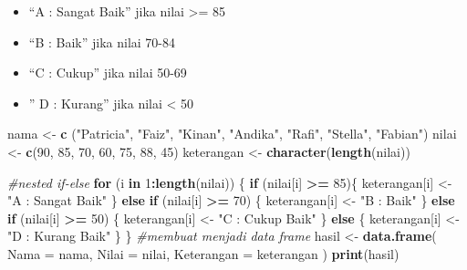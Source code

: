 \documentclass[
]{article}
\newenvironment{Shaded}{\begin{snugshade}}{\end{snugshade}}
\newcommand{\AttributeTok}[1]{\textcolor[rgb]{0.13,0.29,0.53}{#1}}
\newcommand{\CommentTok}[1]{\textcolor[rgb]{0.56,0.35,0.01}{\textit{#1}}}
\newcommand{\ControlFlowTok}[1]{\textcolor[rgb]{0.13,0.29,0.53}{\textbf{#1}}}
\newcommand{\DecValTok}[1]{\textcolor[rgb]{0.00,0.00,0.81}{#1}}
\newcommand{\FunctionTok}[1]{\textcolor[rgb]{0.13,0.29,0.53}{\textbf{#1}}}
\newcommand{\NormalTok}[1]{#1}
\newcommand{\OtherTok}[1]{\textcolor[rgb]{0.56,0.35,0.01}{#1}}
\newcommand{\SpecialCharTok}[1]{\textcolor[rgb]{0.81,0.36,0.00}{\textbf{#1}}}
\newcommand{\StringTok}[1]{\textcolor[rgb]{0.31,0.60,0.02}{#1}}
\begin{document}
\begin{itemize}
\item
  ``A : Sangat Baik'' jika nilai \textgreater= 85
\item
  ``B : Baik'' jika nilai 70-84
\item
  ``C : Cukup'' jika nilai 50-69
\item
  '' D : Kurang'' jika nilai \textless{} 50
\end{itemize}

\begin{Shaded}
\begin{Highlighting}[]
\NormalTok{nama }\OtherTok{\textless{}{-}} \FunctionTok{c}\NormalTok{ (}\StringTok{"Patricia"}\NormalTok{, }\StringTok{"Faiz"}\NormalTok{, }\StringTok{"Kinan"}\NormalTok{, }\StringTok{"Andika"}\NormalTok{, }\StringTok{"Rafi"}\NormalTok{, }\StringTok{"Stella"}\NormalTok{, }\StringTok{"Fabian"}\NormalTok{)}
\NormalTok{nilai }\OtherTok{\textless{}{-}} \FunctionTok{c}\NormalTok{(}\DecValTok{90}\NormalTok{, }\DecValTok{85}\NormalTok{, }\DecValTok{70}\NormalTok{, }\DecValTok{60}\NormalTok{, }\DecValTok{75}\NormalTok{, }\DecValTok{88}\NormalTok{, }\DecValTok{45}\NormalTok{)}
\NormalTok{keterangan }\OtherTok{\textless{}{-}} \FunctionTok{character}\NormalTok{(}\FunctionTok{length}\NormalTok{(nilai))}


\CommentTok{\#nested if{-}else}
\ControlFlowTok{for}\NormalTok{ (i }\ControlFlowTok{in} \DecValTok{1}\SpecialCharTok{:}\FunctionTok{length}\NormalTok{(nilai)) \{}
  \ControlFlowTok{if}\NormalTok{ (nilai[i] }\SpecialCharTok{\textgreater{}=} \DecValTok{85}\NormalTok{)\{}
\NormalTok{    keterangan[i] }\OtherTok{\textless{}{-}} \StringTok{"A : Sangat Baik"}
\NormalTok{  \} }\ControlFlowTok{else} \ControlFlowTok{if}\NormalTok{ (nilai[i] }\SpecialCharTok{\textgreater{}=} \DecValTok{70}\NormalTok{) \{}
\NormalTok{    keterangan[i] }\OtherTok{\textless{}{-}} \StringTok{"B : Baik"}
\NormalTok{  \} }\ControlFlowTok{else} \ControlFlowTok{if}\NormalTok{ (nilai[i] }\SpecialCharTok{\textgreater{}=} \DecValTok{50}\NormalTok{) \{}
\NormalTok{    keterangan[i] }\OtherTok{\textless{}{-}} \StringTok{"C : Cukup Baik"}
\NormalTok{  \} }\ControlFlowTok{else}\NormalTok{ \{}
\NormalTok{    keterangan[i] }\OtherTok{\textless{}{-}} \StringTok{"D : Kurang Baik"}
\NormalTok{  \}}
\NormalTok{\}}
\CommentTok{\#membuat menjadi data frame }
\NormalTok{hasil }\OtherTok{\textless{}{-}} \FunctionTok{data.frame}\NormalTok{(}
  \AttributeTok{Nama =}\NormalTok{ nama,}
  \AttributeTok{Nilai =}\NormalTok{ nilai,}
  \AttributeTok{Keterangan =}\NormalTok{ keterangan}
\NormalTok{)}
\FunctionTok{print}\NormalTok{(hasil)}
\end{Highlighting}
\end{Shaded}
\end{document}
